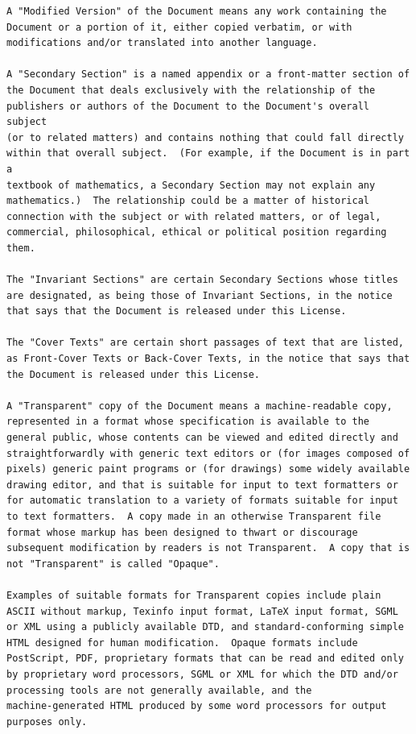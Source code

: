 \documentclass[12pt]{report}
\begin{document}
\begin{verbatim}
A "Modified Version" of the Document means any work containing the
Document or a portion of it, either copied verbatim, or with
modifications and/or translated into another language.

A "Secondary Section" is a named appendix or a front-matter section of
the Document that deals exclusively with the relationship of the
publishers or authors of the Document to the Document's overall subject
(or to related matters) and contains nothing that could fall directly
within that overall subject.  (For example, if the Document is in part a
textbook of mathematics, a Secondary Section may not explain any
mathematics.)  The relationship could be a matter of historical
connection with the subject or with related matters, or of legal,
commercial, philosophical, ethical or political position regarding
them.

The "Invariant Sections" are certain Secondary Sections whose titles
are designated, as being those of Invariant Sections, in the notice
that says that the Document is released under this License.

The "Cover Texts" are certain short passages of text that are listed,
as Front-Cover Texts or Back-Cover Texts, in the notice that says that
the Document is released under this License.

A "Transparent" copy of the Document means a machine-readable copy,
represented in a format whose specification is available to the
general public, whose contents can be viewed and edited directly and
straightforwardly with generic text editors or (for images composed of
pixels) generic paint programs or (for drawings) some widely available
drawing editor, and that is suitable for input to text formatters or
for automatic translation to a variety of formats suitable for input
to text formatters.  A copy made in an otherwise Transparent file
format whose markup has been designed to thwart or discourage
subsequent modification by readers is not Transparent.  A copy that is
not "Transparent" is called "Opaque".

Examples of suitable formats for Transparent copies include plain
ASCII without markup, Texinfo input format, LaTeX input format, SGML
or XML using a publicly available DTD, and standard-conforming simple
HTML designed for human modification.  Opaque formats include
PostScript, PDF, proprietary formats that can be read and edited only
by proprietary word processors, SGML or XML for which the DTD and/or
processing tools are not generally available, and the
machine-generated HTML produced by some word processors for output
purposes only.


\end{verbatim}
\end{document}
